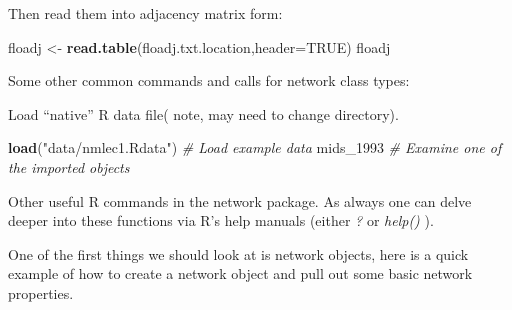 \documentclass[]{book}
\newenvironment{Shaded}{\begin{snugshade}}{\end{snugshade}}
\newcommand{\KeywordTok}[1]{\textcolor[rgb]{0.13,0.29,0.53}{\textbf{{#1}}}}
\newcommand{\DataTypeTok}[1]{\textcolor[rgb]{0.13,0.29,0.53}{{#1}}}
\newcommand{\DecValTok}[1]{\textcolor[rgb]{0.00,0.00,0.81}{{#1}}}
\newcommand{\StringTok}[1]{\textcolor[rgb]{0.31,0.60,0.02}{{#1}}}
\newcommand{\CommentTok}[1]{\textcolor[rgb]{0.56,0.35,0.01}{\textit{{#1}}}}
\newcommand{\OtherTok}[1]{\textcolor[rgb]{0.56,0.35,0.01}{{#1}}}
\newcommand{\NormalTok}[1]{{#1}}
\theoremstyle{definition}
\theoremstyle{definition}
\theoremstyle{definition}
\theoremstyle{remark}
\let\BeginKnitrBlock\begin \let\EndKnitrBlock\end
\begin{document}
Then read them into adjacency matrix form:

\begin{Shaded}
\begin{Highlighting}[]
 \NormalTok{floadj <-}\StringTok{ }\KeywordTok{read.table}\NormalTok{(floadj.txt.location,}\DataTypeTok{header=}\OtherTok{TRUE}\NormalTok{)}
 \NormalTok{floadj  }
\end{Highlighting}
\end{Shaded}

Some other common commands and calls for network class types:

\begin{Shaded}
\end{Shaded}

Load ``native'' R data file( note, may need to change directory).

\begin{Shaded}
\begin{Highlighting}[]
\KeywordTok{load}\NormalTok{(}\StringTok{"data/nmlec1.Rdata"}\NormalTok{)         }\CommentTok{# Load example data}
\NormalTok{mids_1993            }\CommentTok{# Examine one of the imported objects}
\end{Highlighting}
\end{Shaded}

\BeginKnitrBlock{example}
\protect\hypertarget{exm:unnamed-chunk-30}{}{\label{exm:unnamed-chunk-30} }
Other useful R commands in the network package. As always one can delve
deeper into these functions via R's help manuals (either \emph{?} or
\emph{help()} ).

One of the first things we should look at is network objects, here is a
quick example of how to create a network object and pull out some basic
network properties.
\EndKnitrBlock{example}
\end{document}
